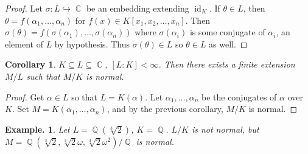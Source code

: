 \documentclass[11pt, a4paper]{memoir}
\DeclareMathOperator{\Q}{{\mathbb{Q}}}
\DeclareMathOperator{\C}{{\mathbb{C}}}
\theoremstyle{change}
\newtheorem{corollary}[theorem]{Corollary}
\theoremstyle{plain}
\theoremstyle{nonumberplain}
\newtheorem{example}{Example.}
\newtheorem{proof}{Proof}
\DeclareMathOperator{\id}{id}
\begin{document}
\begin{proof}
    Let $\sigma:L\hookrightarrow\C$ be an embedding extending $\id_K$.
    If $\theta\in L$, then $\theta=f(\alpha_1,\ldots,\alpha_n)$ for $f(x)\in K[x_1,x_2,\ldots,x_n]$.
    Then $\sigma(\theta)=f(\sigma(\alpha_1),\ldots,\sigma(\alpha_n))$ where $\sigma(\alpha_i)$ is some conjugate of $\alpha_i$, an element of $L$ by hypothesis.
    Thus $\sigma(\theta)\in L$ so $\theta\in L$ as well.
\end{proof}
\begin{corollary}
    $K\subseteq L\subseteq\C$, $[L:K]<\infty$.
    Then there exists a finite extension $M/L$ such that $M/K$ is normal.
\end{corollary}
\begin{proof}
    Get $\alpha\in L$ so that $L=K(\alpha)$.
    Let $\alpha_1,\ldots,\alpha_n$ be the conjugates of $\alpha$ over $K$.
    Set $M=K(\alpha_1,\ldots,\alpha_n)$, and by the previous corollary, $M/K$ is normal.
\end{proof}
\begin{example}
    Let $L=\Q(\sqrt[3]{2})$, $K=\Q$.
    $L/K$ is not normal, but $M=\Q(\sqrt[3]{2},\sqrt[3]{2}\omega,\sqrt[3]{2}\omega^2)/\Q$ is normal.
\end{example}
\end{document}
